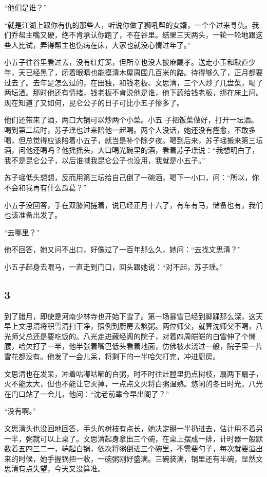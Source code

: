 “他们是谁？”

“就是江湖上跟你有仇的那些人，听说你做了狮吼帮的女婿，一个个过来寻仇。我们乔帮主嘴又硬，绝不肯承认你跑了，不在谷里。结果三天两头，一轮一轮地跟这些人比试，弄得帮主也伤病在床，大家也就没心情过年了。”

小五子往谷里看过去，没有红灯笼，但所幸也没人披麻戴孝。送走小玉和耿直少年，天已经黑了，闭着眼睛也能摸清木屋周围几百米的路。待得够久了，正月都要过去了。去年是怎么过的，在田独，和钱老板、文思清，三个人炒了几盘菜，喝了两坛酒。那时他还有情绪，钱老板不肯说他是谁，他下药给钱老板，绑在床上问。现在知道了又如何，昆仑公子的日子可比小五子惨多了。

他们还带来了酒，两口大锅可以炒两个小菜。小五
子把饭菜做好，打开一坛酒。喝到第二坛时，苏子瑶也过来陪他一起喝。两个人没话，她还没有痊愈，不敢多喝，但总觉得应该陪着小五子，就当是补个除夕夜。喝到后来，苏子瑶搬来第三坛酒，问他还喝吗？他摇摇头，大口喝光碗里的酒，看着苏子瑶说：“我想明白了，我不是昆仑公子，以后谁喊我昆仑公子也没用，我就是小五子。”

苏子瑶低头想想，反而用第三坛给自己倒了一碗酒，喝下一小口，问：“所以，你不会和我再有什么瓜葛？”

小五子没回答，手在双膝间搓着，说已经正月十六了，有车有马，储备也有，我们也该准备出发了。

“去哪里？”

他不回答，她又问不出口，好像过了一百年那么久，她问：“去找文思清？”

小五子起身去喂马，一直走到门口，回头跟她说：“对不起，苏子瑶。”
\newline

{\centering\subsection{3}}

到了腊月，即使是河南少林寺也开始下雪了。第一场暴雪已经到脚踝那么深，这天早上文思清将积雪清扫干净，照例到厨房去熬粥。两位师父，就算沈师父不喝，八光师父总还是要吃饭的。八光走进藏经阁的院子，对着四周皑皑的白雪伸了个懒腰，哈欠打了一半，他半张着嘴巴低头看着地面，仿佛被水浇过一般，院子里一片雪花都没有。他发了一会儿呆，将剩下的一半哈欠打完，冲进厨房。

文思清也在发呆，冲着咕嘟咕嘟的白粥，时不时往灶膛里扔点树枝，扇两下扇子，火不能太大，但也不能让它灭掉，一点点文火将白粥温熟。悠闲的冬日时光，八光在门口站了一会儿，他问：“沈老前辈今早出阁了？”

“没有啊。”

文思清头也没回地回答，手头的树枝有点长，她决定掰一半扔进去，估计用不着另一半，粥就可以上桌了。文思清起身拿出三个碗，在桌上摆成一排，计时器一般默数着五四三二一，端起白锅，依次将粥倒进三个碗里，不需要勺子，每次就要溢出来的时候，她手握锅把一收，一碗粥刚好盛满。三碗装满，锅里还有半碗，显然文思清有点失望，今天又没算准。


